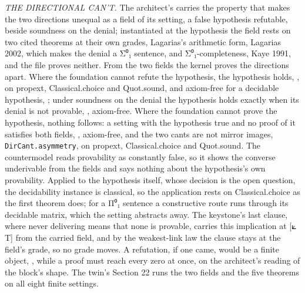 \documentclass[10pt,twocolumn]{article}
\begin{document}
\emph{THE DIRECTIONAL CAN'T.} The architect's
\texttt{} carries the property that
makes the two directions unequal as a field of its setting, a false
hypothesis refutable, beside soundness on the denial; instantiated at
the hypothesis the field rests on two cited theorems at their own
grades, Lagarias's arithmetic form, Lagarias 2002, which makes the
denial a Σ⁰₁ sentence, and Σ⁰₁-completeness, Kaye 1991, and the file
proves neither. From the two fields the kernel proves the directions
apart. Where the foundation cannot refute the hypothesis, the hypothesis
holds, \texttt{}, on propext,
Classical.choice and Quot.sound, and axiom-free for a decidable
hypothesis, \texttt{}; under
soundness on the denial the hypothesis holds exactly when its denial is
not provable, \texttt{},
axiom-free. Where the foundation cannot prove the hypothesis, nothing
follows: a setting with the hypothesis true and no proof of it satisfies
both fields,
\texttt{},
axiom-free, and the two cants are not mirror images,
\texttt{DirCant.asymmetry}, on propext, Classical.choice and Quot.sound.
The countermodel reads provability as constantly false, so it shows the
converse underivable from the fields and says nothing about the
hypothesis's own provability. Applied to the hypothesis itself, whose
decision is the open question, the decidability instance is classical,
so the application rests on Classical.choice as the first theorem does;
for a Π⁰₁ sentence a constructive route runs through its decidable
matrix, which the setting abstracts away. The keystone's last clause,
where never delivering means that none is provable, carries this
implication at {[}⟀ T{]} from the carried field, and by the weakest-link
law the clause stays at the field's grade, so no grade moves. A
refutation, if one came, would be a finite object,
\texttt{}, while a
proof must reach every zero at once, on the architect's reading of the
block's shape. The twin's Section 22 runs the two fields and the five
theorems on all eight finite settings.
\end{document}
